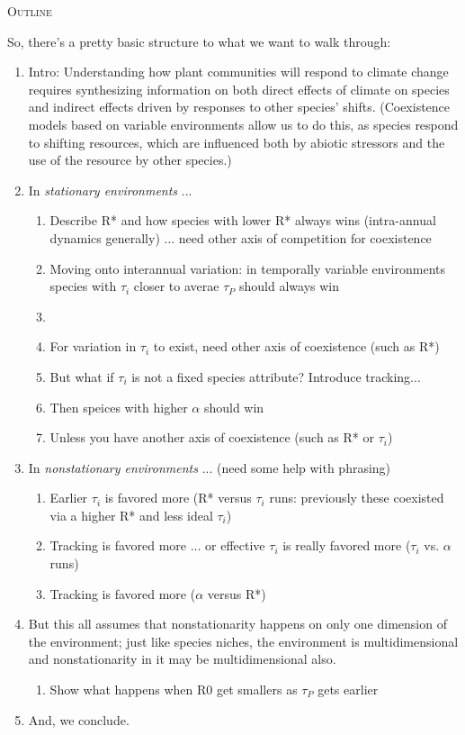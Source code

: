 \documentclass[11pt,letterpaper]{article}
\renewcommand{\section}[1]{%
\bigskip
\begin{center}
\begin{Large}
\normalfont\scshape #1
\medskip
\end{Large}
\end{center}}
\begin{document}
\section{Outline}
So, there's a pretty basic structure to what we want to walk through:
\begin{enumerate}
\item Intro: Understanding how plant communities will respond to climate change
requires synthesizing information on both direct effects of climate on species
and indirect effects driven by responses to other species'
shifts. (Coexistence models based on variable environments allow us to
do this, as species respond to shifting resources, which are
influenced both by abiotic stressors and the use of the resource by
other species.)
\item In \emph{stationary environments} ...
\begin{enumerate}
\item Describe R* and how species with lower R* always wins (intra-annual dynamics generally) ... need other axis of competition for coexistence
\item Moving onto interannual variation: in temporally variable environments species with $\tau_i$ closer to averae $\tau_{P}$ should always win
\item 
\item For variation in $\tau_i$ to exist, need other axis of coexistence (such as R*)
\item But what if $\tau_i$ is not a fixed species attribute? Introduce tracking...
\item Then speices with higher $\alpha$ should win
\item Unless you have another axis of coexistence (such as R* or $\tau_i$)
\end{enumerate}
\item In \emph{nonstationary environments} ... (need some help with phrasing)
\begin{enumerate}
\item Earlier $\tau_i$ is favored more (R* versus $\tau_i$ runs: previously these coexisted via a higher R* and less ideal $\tau_i$)
\item Tracking is favored more ... or effective $\tau_i$ is really favored more ($\tau_i$ vs. $\alpha$ runs)
\item Tracking is favored more ($\alpha$ versus R*)
\end{enumerate}
\item But this all assumes that nonstationarity happens on only one dimension of the environment; just like species niches, the environment is multidimensional and nonstationarity in it may be multidimensional also. 
\begin{enumerate}
\item Show what happens when R0 get smallers as $\tau_{P}$ gets earlier
\end{enumerate}
\item And, we conclude.
\end{enumerate}
\end{document}
